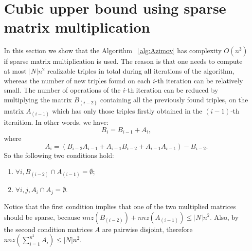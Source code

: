 \section{Cubic upper bound using sparse matrix multiplication}
In this section we show that the Algorithm ~\ref{alg:Azimov} has complexity $O(n^3)$ if sparse matrix multiplication is used. The reason is that one needs to compute at most $|N|n^2$ realizable triples in total during all iterations of the algorithm, whereas the number of new triples found on each $i$-th iteration can be relatively small. The number of operations of the $i$-th iteration can be reduced by multiplying the matrix $B_{(i-2)}$ containing all the previously found triples, on the matrix $A_{(i-1)}$ which has only those triples firstly obtained in the $(i-1)$-th iteraition. In other words, we have:
\begin{equation}
\label{Bi}
B_i = B_{i-1} + A_i, 
\end{equation}
where
\begin{equation}
\label{Ai}
A_i = (B_{i-2}A_{i-1} + A_{i-1}B_{i-2} + A_{i-1}A_{i-1}) - B_{i-2}.
\end{equation}
So the following two conditions hold:
\begin{enumerate}
\item $\forall i, B_{(i-2)} \cap A_{(i-1)} = \emptyset$;
\item $\forall i, j,  A_i \cap A_j = \emptyset$.
\end{enumerate}
Notice that the first condition implies that one of the two multiplied matrices should be sparse, because $nnz(B_{(i-2)}) + nnz(A_{(i-1)}) \le |N|n^2$. Also, by the second condition matrices $A$ are pairwise disjoint, therefore $nnz(\sum\limits_{i=1}^{n^2}{A_i}) \le |N|n^2$. 



